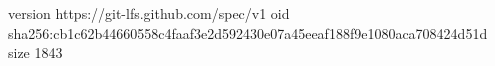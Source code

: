 version https://git-lfs.github.com/spec/v1
oid sha256:cb1c62b44660558c4faaf3e2d592430e07a45eeaf188f9e1080aca708424d51d
size 1843
